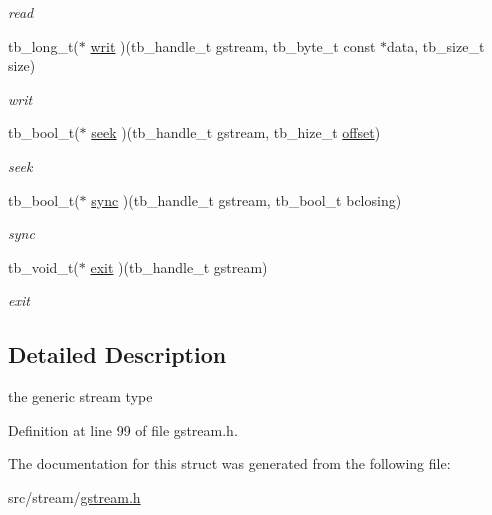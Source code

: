 \begin{DoxyCompactItemize}
\begin{DoxyCompactList}\small\item\em read \end{DoxyCompactList}\item 
\hypertarget{structtb__gstream__t_aaf12bb5d310d8b83fa6a74642cf8283a}{tb\-\_\-long\-\_\-t($\ast$ \hyperlink{structtb__gstream__t_aaf12bb5d310d8b83fa6a74642cf8283a}{writ} )(tb\-\_\-handle\-\_\-t gstream, tb\-\_\-byte\-\_\-t const $\ast$data, tb\-\_\-size\-\_\-t size)}\label{structtb__gstream__t_aaf12bb5d310d8b83fa6a74642cf8283a}

\begin{DoxyCompactList}\small\item\em writ \end{DoxyCompactList}\item 
\hypertarget{structtb__gstream__t_a270aa624dc7eef4fde8a34ccf616c6d8}{tb\-\_\-bool\-\_\-t($\ast$ \hyperlink{structtb__gstream__t_a270aa624dc7eef4fde8a34ccf616c6d8}{seek} )(tb\-\_\-handle\-\_\-t gstream, tb\-\_\-hize\-\_\-t \hyperlink{structtb__gstream__t_aafb9f870fb1d25ae501f72e5447ca18b}{offset})}\label{structtb__gstream__t_a270aa624dc7eef4fde8a34ccf616c6d8}

\begin{DoxyCompactList}\small\item\em seek \end{DoxyCompactList}\item 
\hypertarget{structtb__gstream__t_aad880e4054f6c5bcbe63b9187ff56836}{tb\-\_\-bool\-\_\-t($\ast$ \hyperlink{structtb__gstream__t_aad880e4054f6c5bcbe63b9187ff56836}{sync} )(tb\-\_\-handle\-\_\-t gstream, tb\-\_\-bool\-\_\-t bclosing)}\label{structtb__gstream__t_aad880e4054f6c5bcbe63b9187ff56836}

\begin{DoxyCompactList}\small\item\em sync \end{DoxyCompactList}\item 
\hypertarget{structtb__gstream__t_a44b6842be8d6b0224baecfea2accba5d}{tb\-\_\-void\-\_\-t($\ast$ \hyperlink{structtb__gstream__t_a44b6842be8d6b0224baecfea2accba5d}{exit} )(tb\-\_\-handle\-\_\-t gstream)}\label{structtb__gstream__t_a44b6842be8d6b0224baecfea2accba5d}

\begin{DoxyCompactList}\small\item\em exit \end{DoxyCompactList}\end{DoxyCompactItemize}


\subsection{Detailed Description}
the generic stream type 

Definition at line 99 of file gstream.\-h.



The documentation for this struct was generated from the following file\-:\begin{DoxyCompactItemize}
\item 
src/stream/\hyperlink{gstream_8h}{gstream.\-h}\end{DoxyCompactItemize}
